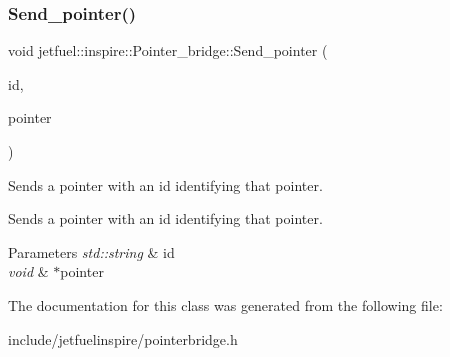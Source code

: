 \subsubsection{\texorpdfstring{Send\+\_\+pointer()}{Send\_pointer()}}
{\footnotesize\ttfamily void jetfuel\+::inspire\+::\+Pointer\+\_\+bridge\+::\+Send\+\_\+pointer (\begin{DoxyParamCaption}\item[{std\+::string}]{id,  }\item[{void $\ast$}]{pointer }\end{DoxyParamCaption})\hspace{0.3cm}{\ttfamily [inline]}}



Sends a pointer with an id identifying that pointer. 

Sends a pointer with an id identifying that pointer.


\begin{DoxyParams}{Parameters}
{\em std\+::string} & id \\
\hline
{\em void} & $\ast$pointer \\
\hline
\end{DoxyParams}


The documentation for this class was generated from the following file\+:\begin{DoxyCompactItemize}
\item 
include/jetfuelinspire/pointerbridge.\+h\end{DoxyCompactItemize}
